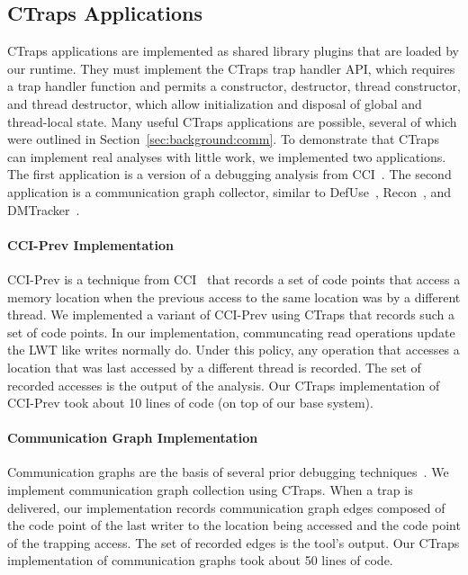 \documentclass[preprint,9pt]{sigplanconf}
\newcommand{\ctraps}{CTraps\xspace}
\begin{document}
\subsection{\ctraps Applications}
\label{sec:apps}
\ctraps applications are implemented as shared library plugins that are loaded
by our runtime.  They must implement the \ctraps trap handler API, which
requires a trap handler function and permits a constructor, destructor, thread
constructor, and thread destructor, which allow initialization and disposal of
global and thread-local state.  Many useful \ctraps applications are possible,
several of which were outlined in Section~\ref{sec:background:comm}.    To
demonstrate that \ctraps can implement real analyses with little work, we
implemented two applications. The first application is a version of a debugging
analysis from CCI~\cite{cci}.  The second application is a communication graph
collector, similar to DefUse~\cite{defuse}, Recon~\cite{recon}, and
DMTracker~\cite{dmtracker}.

\paragraph{CCI-Prev Implementation}
CCI-Prev is a technique from CCI~\cite{cci} that records a set of code points
that access a memory location when the previous access to the same location was
by a different thread.  We implemented a variant of CCI-Prev using \ctraps that
records such a set of code points.  In our implementation, communcating read
operations update the LWT like writes normally do.  Under this policy, any
operation that accesses a location that was last accessed by a different thread
is recorded.  The set of recorded accesses is the output of the analysis.  Our
\ctraps implementation of CCI-Prev took about 10 lines of code (on top of our
base system). 

\paragraph{Communication Graph Implementation}
Communication graphs are the basis of several prior debugging
techniques~\cite{recon, bugaboo, defuse}.  We implement communication graph
collection using \ctraps.  When a trap is delivered, our implementation records
communication graph edges composed of the code point of the last writer to the
location being accessed and the code point of the trapping access.  The set of
recorded edges is the tool's output.  Our \ctraps implementation of
communication graphs took about 50 lines of code. 
\end{document}
